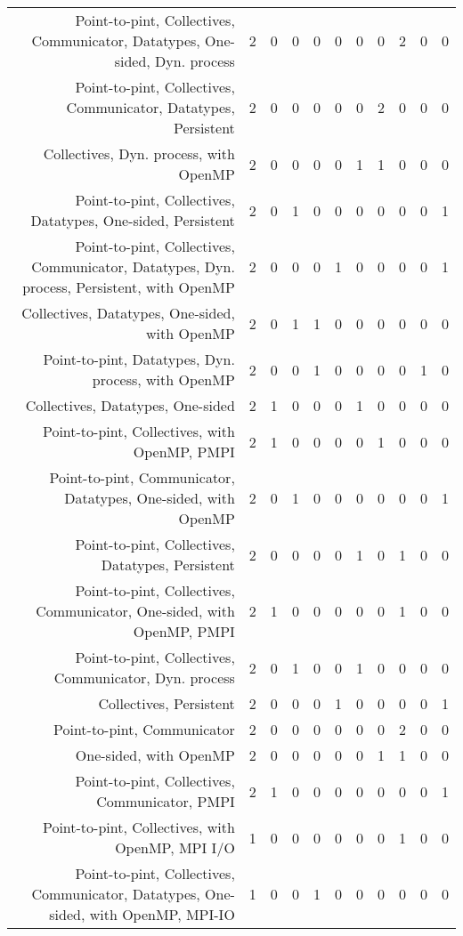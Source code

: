 {\begin{landscape}
\begin{longtable}[htb]{r|c|c|c|c|c|c|c|c|c|c}
{Point-to-pint, Collectives, Communicator, Datatypes, One-sided, Dyn. process} & 2 & 0 & 0 & 0 & 0 & 0 & 0 & 2 & 0 & 0 \\%
{Point-to-pint, Collectives, Communicator, Datatypes, Persistent} & 2 & 0 & 0 & 0 & 0 & 0 & 2 & 0 & 0 & 0 \\%
{Collectives, Dyn. process, with OpenMP} & 2 & 0 & 0 & 0 & 0 & 1 & 1 & 0 & 0 & 0 \\%
{Point-to-pint, Collectives, Datatypes, One-sided, Persistent} & 2 & 0 & 1 & 0 & 0 & 0 & 0 & 0 & 0 & 1 \\%
{Point-to-pint, Collectives, Communicator, Datatypes, Dyn. process, Persistent, with OpenMP} & 2 & 0 & 0 & 0 & 1 & 0 & 0 & 0 & 0 & 1 \\%
{Collectives, Datatypes, One-sided, with OpenMP} & 2 & 0 & 1 & 1 & 0 & 0 & 0 & 0 & 0 & 0 \\%
{Point-to-pint, Datatypes, Dyn. process, with OpenMP} & 2 & 0 & 0 & 1 & 0 & 0 & 0 & 0 & 1 & 0 \\%
{Collectives, Datatypes, One-sided} & 2 & 1 & 0 & 0 & 0 & 1 & 0 & 0 & 0 & 0 \\%
{Point-to-pint, Collectives, with OpenMP, PMPI} & 2 & 1 & 0 & 0 & 0 & 0 & 1 & 0 & 0 & 0 \\%
{Point-to-pint, Communicator, Datatypes, One-sided, with OpenMP} & 2 & 0 & 1 & 0 & 0 & 0 & 0 & 0 & 0 & 1 \\%
{Point-to-pint, Collectives, Datatypes, Persistent} & 2 & 0 & 0 & 0 & 0 & 1 & 0 & 1 & 0 & 0 \\%
{Point-to-pint, Collectives, Communicator, One-sided, with OpenMP, PMPI} & 2 & 1 & 0 & 0 & 0 & 0 & 0 & 1 & 0 & 0 \\%
{Point-to-pint, Collectives, Communicator, Dyn. process} & 2 & 0 & 1 & 0 & 0 & 1 & 0 & 0 & 0 & 0 \\%
{Collectives, Persistent} & 2 & 0 & 0 & 0 & 1 & 0 & 0 & 0 & 0 & 1 \\%
{Point-to-pint, Communicator} & 2 & 0 & 0 & 0 & 0 & 0 & 0 & 2 & 0 & 0 \\%
{One-sided, with OpenMP} & 2 & 0 & 0 & 0 & 0 & 0 & 1 & 1 & 0 & 0 \\%
{Point-to-pint, Collectives, Communicator, PMPI} & 2 & 1 & 0 & 0 & 0 & 0 & 0 & 0 & 0 & 1 \\%
{Point-to-pint, Collectives, with OpenMP, MPI I/O} & 1 & 0 & 0 & 0 & 0 & 0 & 0 & 1 & 0 & 0 \\%
{Point-to-pint, Collectives, Communicator, Datatypes, One-sided, with OpenMP, MPI-IO} & 1 & 0 & 0 & 1 & 0 & 0 & 0 & 0 & 0 & 0 \\%

\end{longtable}
\end{landscape}}

